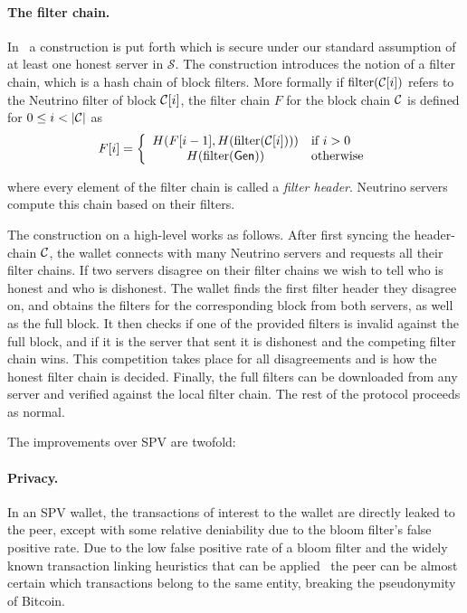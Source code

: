 \paragraph{The filter chain.}
\def\fltr{\text{filter}}
In~\cite{bip157} a construction is put forth which is secure under our standard assumption of at least one honest server in $\mathcal{S}$. The construction introduces the notion of a filter chain, which is a hash chain of block filters. More formally if $\fltr(\chain[i])$ refers to the Neutrino filter of block $\mathcal{C}[i]$, the filter chain $F$ for the block chain $\mathcal{C}$ is defined for $0 \le i < |\mathcal{C}|$ as
\[
F[i] = \left\{
    \begin{array}{cl}
        H(F[i-1], H(\fltr(\chain[i]))) & \text{if } i > 0 \\
        H(\fltr(\Gen)) & \text{otherwise}
    \end{array}
\right.
\]

where every element of the filter chain is called a \emph{filter header}. Neutrino servers compute this chain based on their filters.

The construction on a high-level works as follows. After first syncing the header-chain $\mathcal{C}$, the wallet connects with many Neutrino servers and requests all their filter chains. If two servers disagree on their filter chains we wish to tell who is honest and who is dishonest. The wallet finds the first filter header they disagree on, and obtains the filters for the corresponding block from both servers, as well as the full block. It then checks if one of the provided filters is invalid against the full block, and if it is the server that sent it is dishonest and the competing filter chain wins. This competition takes place for all disagreements and is how the honest filter chain is decided. Finally, the full filters can be downloaded from any server and verified against the local filter chain. The rest of the protocol proceeds as normal.



The improvements over SPV are twofold:
\paragraph{Privacy.} In an SPV wallet, the transactions of interest to the wallet are directly leaked to the peer, except with some relative deniability due to the bloom filter's false positive rate. Due to the low false positive rate of a bloom filter and the widely known transaction linking heuristics that can be applied~\cite{meiklejohn2013fistful,gervais2014privacy}
the peer can be almost certain which transactions belong to the same entity, breaking the pseudonymity of Bitcoin.
